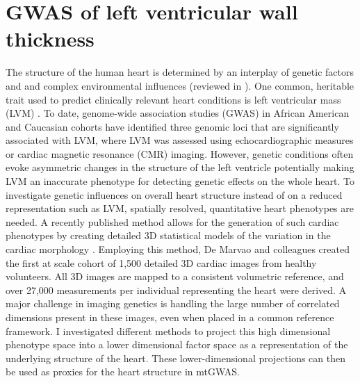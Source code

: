 \chapter{GWAS of left ventricular wall thickness}
\label{section:GWAS_pheno3D}
The structure of the human heart is determined by an interplay of genetic factors and and complex environmental influences (reviewed in \citep{Payne1995, Sanoudou2005, O'Toole2008}). One common, heritable trait used to predict clinically relevant heart conditions is left ventricular mass (LVM) \citep{Post1997}. To date, genome-wide association studies (GWAS) in African American \citep{Fox2013} and Caucasian cohorts \citep{Vasan2007, Vasan2009, Arnett2009} have identified three genomic loci that are significantly associated with LVM, where LVM was assessed using echocardiographic measures or cardiac magnetic resonance (CMR) imaging. However, genetic conditions often evoke asymmetric changes in the structure of the left ventricle \citep{Chen1999, VanderMerwe2008} potentially making LVM an inaccurate phenotype for detecting genetic effects on the whole heart. To investigate genetic influences on overall heart structure instead of on a reduced representation such as LVM, spatially resolved, quantitative heart phenotypes are needed. 
A recently published method allows for the generation of such cardiac phenotypes by creating detailed 3D statistical models of the variation in the cardiac morphology \citep{DeMarvao2014}. Employing this method, De Marvao and colleagues created the first at scale cohort of 1,500 detailed 3D cardiac images from healthy volunteers.
All 3D images are mapped to a consistent volumetric reference, and over 27,000 measurements per individual representing the heart were derived. A major challenge in imaging genetics is handling the large number of correlated dimensions present in these images, even when placed in a common reference framework.  I investigated different methods to project this high dimensional phenotype space into a lower dimensional factor space as a representation of the underlying structure of the heart. These lower-dimensional projections can then be used as proxies for the heart structure in mtGWAS.